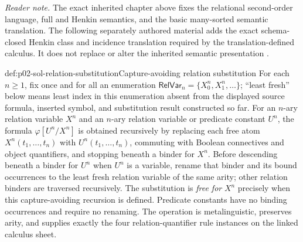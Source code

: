 
\noindent\textit{Reader note.}  The exact inherited chapter above fixes the
relational second-order language, full and Henkin semantics, and the basic
many-sorted semantic translation.  The following separately authored material
adds the exact schema-closed Henkin class and incidence translation required by
the translation-defined calculus.  It does not replace or alter the inherited
semantic presentation \cite{Henkin1950,Manzano1996}.

\begin{hbdefinition}{def:p02-sol-relation-substitution}{Capture-avoiding relation substitution}
For each \(n\geq1\), fix once and for all an enumeration
\(\mathsf{RelVar}_n=\{X^n_0,X^n_1,\ldots\}\); ``least fresh'' below means
least index in this enumeration absent from the displayed source formula,
inserted symbol, and substitution result constructed so far.
For an \(n\)-ary relation variable \(X^n\) and an \(n\)-ary relation variable
or predicate constant \(U^n\), the formula
\(\varphi[U^n/X^n]\) is obtained recursively by replacing each free atom
\(X^n(t_1,\ldots,t_n)\) with \(U^n(t_1,\ldots,t_n)\), commuting with Boolean
connectives and object quantifiers, and stopping beneath a binder for
\(X^n\).  Before descending beneath a binder for \(U^n\) when \(U^n\) is a
variable, rename that binder and its bound occurrences to the least fresh
relation variable of the same arity; other relation binders are traversed
recursively.  The substitution is \emph{free for} \(X^n\) precisely when this
capture-avoiding recursion is defined.  Predicate constants have no binding
occurrences and require no renaming.  The operation is metalinguistic,
preserves arity, and supplies exactly the four relation-quantifier rule
instances on the linked calculus sheet.
\end{hbdefinition}

